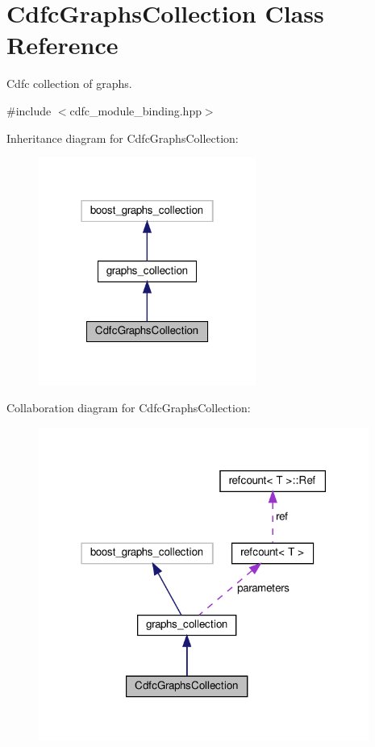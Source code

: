 \hypertarget{classCdfcGraphsCollection}{}\section{Cdfc\+Graphs\+Collection Class Reference}
\label{classCdfcGraphsCollection}


Cdfc collection of graphs.  




{\ttfamily \#include $<$cdfc\+\_\+module\+\_\+binding.\+hpp$>$}



Inheritance diagram for Cdfc\+Graphs\+Collection\+:
\nopagebreak
\begin{figure}[H]
\begin{center}
\leavevmode
\includegraphics[width=202pt]{d1/d4a/classCdfcGraphsCollection__inherit__graph}
\end{center}
\end{figure}


Collaboration diagram for Cdfc\+Graphs\+Collection\+:
\nopagebreak
\begin{figure}[H]
\begin{center}
\leavevmode
\includegraphics[width=307pt]{d4/d31/classCdfcGraphsCollection__coll__graph}
\end{center}
\end{figure}
